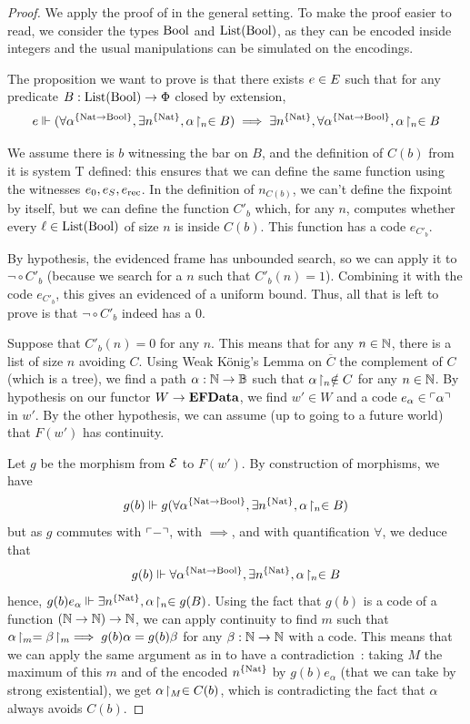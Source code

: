 \documentclass[a4paper,UKenglish,cleveref, autoref, thm-restate]{lipics-v2021}
\begin{document}
\begin{proof}
  We apply the proof of  in the general setting. To make the proof easier to read, we consider the types $\mathrm{Bool}$ and $\mathrm{List}(\mathrm{Bool})$, as they can be encoded inside integers and the usual manipulations can be simulated on the encodings.

  The proposition we want to prove is that there exists $e \in E$ such that for any predicate $B : \mathrm{List}(\mathrm{Bool}) \to \Phi$ closed by extension,
  \[
    e\Vdash (\forall \alpha^{\{\mathrm{Nat} \to \mathrm{Bool}\}}, \exists n^{\{\mathrm{Nat}\}}, {\alpha}\!\upharpoonright_{n} \in B) \implies
    \exists n^{\{\mathrm{Nat}\}}, \forall \alpha^{\{\mathrm{Nat} \to \mathrm{Bool}\}}, {\alpha}\!\upharpoonright_{n} \in B
  \]

  We assume there is $b$ witnessing the bar on $B$, and the definition of $C(b)$ from it is system T defined: this ensures that we can define the same function using the witnesses $e_{0},e_S,e_{\mathrm{rec}}$. In the definition of $n_{C(b)}$, we can't define the fixpoint by itself, but we can define the function $C'_b$ which, for any $n$, computes whether every $\ell \in \mathrm{List}(\mathrm{Bool})$ of size $n$ is inside $C(b)$. This function has a code $e_{C'_b}$.

  By hypothesis, the evidenced frame has unbounded search, so we can apply it to $\lnot \circ C'_b$ (because we search for a $n$ such that $C'_b(n) = 1$). Combining it with the code $e_{C'_b}$, this gives an evidenced of a uniform bound. Thus, all that is left to prove is that $\lnot \circ C'_b$ indeed has a $0$.

  Suppose that $C'_b(n) = 0$ for any $n$. This means that for any $n \in \mathbb N$, there is a list of size $n$ avoiding $C$. Using Weak König's Lemma on $\overline{C}$ the complement of $C$ (which is a tree), we find a path $\alpha : \mathbb N \to \mathbb B$ such that ${\alpha}\!\upharpoonright_{n} \notin C$ for any $n \in \mathbb N$. By hypothesis on our functor $W \to \mathbf{EFData}$, we find $w' \in W$ and a code $e_\alpha \in \ulcorner\alpha\urcorner$ in $w'$. By the other hypothesis, we can assume (up to going to a future world) that $F(w')$ has continuity.

  Let $g$ be the morphism from $\mathcal{E}$ to $F(w')$. By construction of morphisms, we have
  \[g(b)\Vdash g(\forall \alpha^{\{\mathrm{Nat} \to \mathrm{Bool}\}}, \exists n^{\{\mathrm{Nat}\}}, {\alpha}\!\upharpoonright_{n} \in B)\]
  but as $g$ commutes with $\ulcorner-\urcorner$, with $\implies$, and with quantification $\forall$, we deduce that
  \[g(b)\Vdash \forall \alpha^{\{\mathrm{Nat} \to \mathrm{Bool}\}}, \exists n^{\{\mathrm{Nat}\}}, {\alpha}\!\upharpoonright_{n} \in B\]
  hence, $g(b) e_{\alpha} \Vdash \exists n^{\{\mathrm{Nat}\}}, {\alpha}\!\upharpoonright_{n} \in g(B)$. Using the fact that $g(b)$ is a code of a function $(\mathbb N \to \mathbb N) \to \mathbb N$, we can apply continuity to find $m$ such that ${\alpha}\!\upharpoonright_{m} = {\beta}\!\upharpoonright_{m} \implies g(b) \alpha = g(b) \beta$ for any $\beta : \mathbb N \to \mathbb N$ with a code. This means that we can apply the same argument as in  to have a contradiction~: taking $M$ the maximum of this $m$ and of the encoded $n^{\{\mathrm{Nat}\}}$ by $g(b) e_{\alpha}$ (that we can take by strong existential), we get ${\alpha}\!\upharpoonright_{M} \in C(b)$, which is contradicting the fact that $\alpha$ always avoids $C(b)$.
\end{proof}
\end{document}
